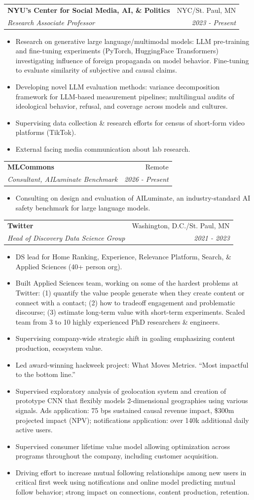 \documentclass[letterpaper,11pt]{article}
\makeatletter
\newcommand{\resitem}[1]{\item #1 \vspace{-6pt}}
\newcommand{\ressubheading}[4]{\vspace{2pt}
\begin{tabular*}{7.58in}{l@{\extracolsep{\fill}}r}
		\textbf{#1} & #2 \\
		\textit{#3} & \textit{#4} \\
\end{tabular*}\vspace{-1pt}}
\makeatother
\begin{document}
\ressubheading{NYU's Center for Social Media, AI, \& Politics}{NYC/St. Paul, MN}{Research Associate Professor}{2023 - Present}
	\begin{itemize}
		\resitem{Research on generative large language/multimodal models: LLM pre-training and fine-tuning experiments (PyTorch, HuggingFace Transformers) investigating influence of foreign propaganda on model behavior. Fine-tuning to evaluate similarity of subjective and causal claims.}
		\resitem{Developing novel LLM evaluation methods: variance decomposition framework for LLM-based measurement pipelines; multilingual audits of ideological behavior, refusal, and coverage across models and cultures.}
		\resitem{Supervising data collection \& research efforts for census of short-form video platforms (TikTok).}
       	 	\resitem{External facing media communication about lab research.}
	\end{itemize}

\ressubheading{MLCommons}{Remote}{Consultant, AILuminate Benchmark}{2026 - Present}
	\begin{itemize}
		\resitem{Consulting on design and evaluation of AILuminate, an industry-standard AI safety benchmark for large language models.}
	\end{itemize}


\ressubheading{Twitter}{Washington, D.C./St. Paul, MN}{Head of Discovery Data Science Group}{2021 - 2023}
	\begin{itemize}
		\resitem{DS lead for Home Ranking, Experience, Relevance Platform, Search, \& Applied Sciences (40+ person org).} 
       	 	\resitem{Built Applied Sciences team, working on some of the hardest problems at Twitter: (1) quantify the value people generate when they create content or connect with a contact; (2) how to tradeoff engagement and problematic discourse; (3) estimate long-term value with short-term experiments. Scaled team from 3 to 10 highly experienced PhD researchers \& engineers.}
		\resitem{Supervising company-wide strategic shift in goaling emphasizing content production, ecosystem value.} 
		\resitem{Led award-winning hackweek project: What Moves Metrics. ``Most impactful to the bottom line.''} 
		\resitem{Supervised exploratory analysis of geolocation system and creation of prototype CNN that flexibly models 2-dimensional geographies using various signals. Ads application: 75 bps sustained causal revenue impact, \$300m projected impact (NPV); notifications application: over 140k additional daily active users.} 
		\resitem{Supervised consumer lifetime value model allowing optimization across programs throughout the company, including customer acquisition.} 
		\resitem{Driving effort to increase mutual following relationships among new users in critical first week using notifications and online model predicting mutual follow behavior; strong impact on connections, content production, retention.} 
	\end{itemize}
\end{document}
